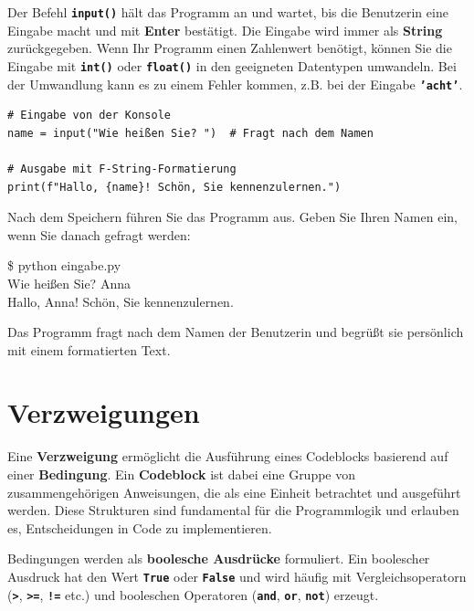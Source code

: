 \documentclass[ngerman,11pt]{article}
\begin{document}
Der Befehl \textbf{\texttt{input()}} hält das Programm an und wartet, bis die Benutzerin eine Eingabe macht und mit \textbf{Enter} bestätigt. Die Eingabe wird immer als \textbf{String} zurückgegeben. Wenn Ihr Programm einen Zahlenwert benötigt, können Sie die Eingabe mit \textbf{\texttt{int()}} oder \textbf{\texttt{float()}} in den geeigneten Datentypen umwandeln. Bei der Umwandlung kann es zu einem Fehler kommen, z.B. bei der Eingabe \textbf{\texttt{'acht'}}.

\begin{lstlisting}[caption=eingabe.py]
# Eingabe von der Konsole
name = input("Wie heißen Sie? ")  # Fragt nach dem Namen

# Ausgabe mit F-String-Formatierung
print(f"Hallo, {name}! Schön, Sie kennenzulernen.")
\end{lstlisting}

Nach dem Speichern führen Sie das Programm aus. Geben Sie Ihren Namen ein, wenn Sie danach gefragt werden:

\begin{tcolorbox}[colback=gray!15, fontupper=\ttfamily, boxrule=0.5pt,
    left=3mm, right=3mm, top=2mm, bottom=2mm]
\$ python eingabe.py\\
Wie heißen Sie? Anna\\
Hallo, Anna! Schön, Sie kennenzulernen.
\end{tcolorbox}

\noindent Das Programm fragt nach dem Namen der Benutzerin und begrüßt sie persönlich mit einem formatierten Text.

\section{Verzweigungen}

Eine \textbf{Verzweigung} ermöglicht die Ausführung eines Codeblocks basierend auf einer \textbf{Bedingung}. Ein \textbf{Codeblock} ist dabei eine Gruppe von zusammengehörigen Anweisungen, die als eine Einheit betrachtet und ausgeführt werden. Diese Strukturen sind fundamental für die Programmlogik und erlauben es, Entscheidungen in Code zu implementieren.

Bedingungen werden als \textbf{boolesche Ausdrücke} formuliert. Ein boolescher Ausdruck hat den Wert \textbf{\texttt{True}} oder \textbf{\texttt{False}} und wird häufig mit Vergleichsoperatorn (\textbf{\texttt{>}}, \textbf{\texttt{>=}}, \textbf{\texttt{!=}} etc.) und booleschen Operatoren (\textbf{\texttt{and}}, \textbf{\texttt{or}}, \textbf{\texttt{not}}) erzeugt.
\end{document}
